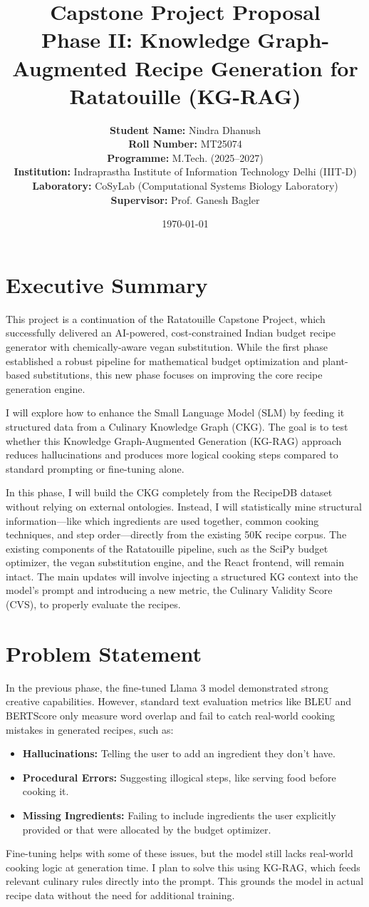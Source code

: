 \documentclass[12pt,a4paper]{article}
\title{\textbf{Capstone Project Proposal} \\ \Large Phase II: Knowledge Graph-Augmented Recipe Generation for Ratatouille (KG-RAG)}
\author{
    \textbf{Student Name:} Nindra Dhanush \\
    \textbf{Roll Number:} MT25074 \\
    \textbf{Programme:} M.Tech. (2025--2027) \\
    \textbf{Institution:} Indraprastha Institute of Information Technology Delhi (IIIT-D) \\
    \textbf{Laboratory:} CoSyLab (Computational Systems Biology Laboratory) \\
    \textbf{Supervisor:} Prof. Ganesh Bagler
}
\date{\today}
\begin{document}
\maketitle

\section*{Executive Summary}
This project is a continuation of the Ratatouille Capstone Project, which successfully delivered an AI-powered, cost-constrained Indian budget recipe generator with chemically-aware vegan substitution. While the first phase established a robust pipeline for mathematical budget optimization and plant-based substitutions, this new phase focuses on improving the core recipe generation engine. 

I will explore how to enhance the Small Language Model (SLM) by feeding it structured data from a Culinary Knowledge Graph (CKG). The goal is to test whether this Knowledge Graph-Augmented Generation (KG-RAG) approach reduces hallucinations and produces more logical cooking steps compared to standard prompting or fine-tuning alone.

In this phase, I will build the CKG completely from the RecipeDB dataset without relying on external ontologies. Instead, I will statistically mine structural information---like which ingredients are used together, common cooking techniques, and step order---directly from the existing 50K recipe corpus. The existing components of the Ratatouille pipeline, such as the SciPy budget optimizer, the vegan substitution engine, and the React frontend, will remain intact. The main updates will involve injecting a structured KG context into the model's prompt and introducing a new metric, the Culinary Validity Score (CVS), to properly evaluate the recipes.

\section*{Problem Statement}
In the previous phase, the fine-tuned Llama 3 model demonstrated strong creative capabilities. However, standard text evaluation metrics like BLEU and BERTScore only measure word overlap and fail to catch real-world cooking mistakes in generated recipes, such as:
\begin{itemize}[noitemsep]
    \item \textbf{Hallucinations:} Telling the user to add an ingredient they don't have.
    \item \textbf{Procedural Errors:} Suggesting illogical steps, like serving food before cooking it.
    \item \textbf{Missing Ingredients:} Failing to include ingredients the user explicitly provided or that were allocated by the budget optimizer.
\end{itemize}
Fine-tuning helps with some of these issues, but the model still lacks real-world cooking logic at generation time. I plan to solve this using KG-RAG, which feeds relevant culinary rules directly into the prompt. This grounds the model in actual recipe data without the need for additional training.
\end{document}
